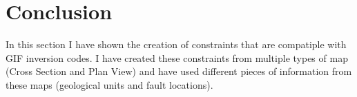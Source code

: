 \section{Conclusion}
\label{sec:GIFtoolsConc}

In this section I have shown the creation of constraints that are compatiple with \ac{GIF} inversion codes. I have created these constraints from multiple types of map (Cross Section and Plan View) and have used different pieces of information from these maps (geological units and fault locations).



%

\endinput

Any text after an \endinput is ignored.
You could put scraps here or things in progress.
